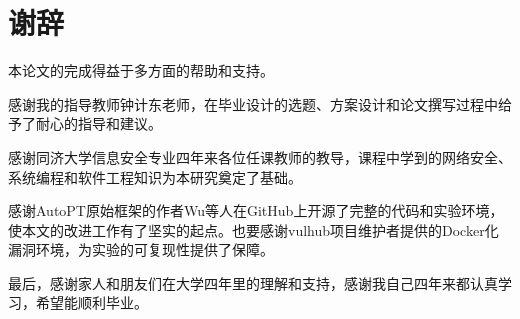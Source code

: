 \chapter*{谢辞}

本论文的完成得益于多方面的帮助和支持。

感谢我的指导教师钟计东老师，在毕业设计的选题、方案设计和论文撰写过程中给予了耐心的指导和建议。

感谢同济大学信息安全专业四年来各位任课教师的教导，课程中学到的网络安全、系统编程和软件工程知识为本研究奠定了基础。

感谢AutoPT原始框架的作者Wu等人在GitHub上开源了完整的代码和实验环境，使本文的改进工作有了坚实的起点。也要感谢vulhub项目维护者提供的Docker化漏洞环境，为实验的可复现性提供了保障。

最后，感谢家人和朋友们在大学四年里的理解和支持，感谢我自己四年来都认真学习，希望能顺利毕业。
